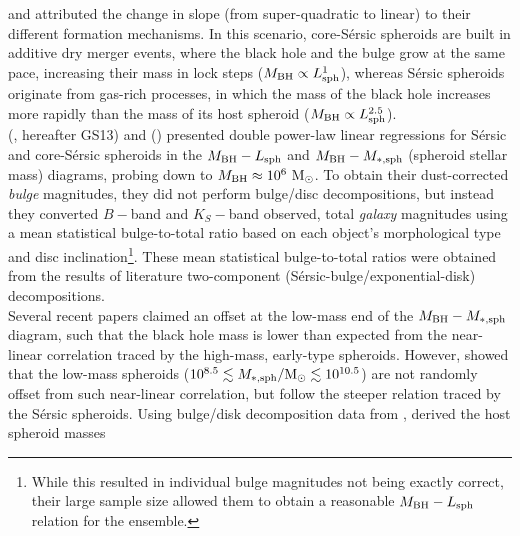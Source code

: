\documentclass[preprint2]{emulateapj}
\begin{document}
and attributed the change in slope (from super-quadratic to linear) to their different formation mechanisms. 
In this scenario, core-S\'ersic spheroids are built in additive dry merger events, 
where the black hole and the bulge grow at the same pace, increasing their mass in lock steps ($M_{\rm BH} \propto L_{\rm sph}^1$), 
whereas S\'ersic spheroids originate from gas-rich processes, 
in which the mass of the black hole increases more rapidly than the mass of its host spheroid ($M_{\rm BH} \propto L_{\rm sph}^{2.5}$). \\
\citeauthor{grahamscott2013} (\citeyear{grahamscott2013}, hereafter GS13) and \citeauthor{scott2013} (\citeyear{scott2013}) 
presented double power-law linear regressions 
for S\'ersic and core-S\'ersic spheroids in the $M_{\rm BH} - L_{\rm sph}$ and $M_{\rm BH} - M_{\rm *,sph}$ 
(spheroid stellar mass) diagrams, probing down to $M_{\rm BH} \approx 10^6\rm~M_\odot$. 
To obtain their dust-corrected \emph{bulge} magnitudes, they did not perform bulge/disc decompositions, 
but instead they converted $B-$band and $K_S-$band observed, total \emph{galaxy} magnitudes 
using a mean statistical bulge-to-total ratio based on each object's morphological type and disc 
inclination\footnote{While this resulted in individual bulge magnitudes not being exactly correct, 
their large sample size allowed them to obtain a reasonable $M_{\rm BH} - L_{\rm sph}$ relation for the ensemble.}. 
These mean statistical bulge-to-total ratios were obtained from the results of literature two-component (S\'ersic-bulge/exponential-disk) decompositions. \\
Several recent papers \citep{jiang2011a,jiang2013,mathur2012,reines2013} claimed an offset at the low-mass end of the $M_{\rm BH} - M_{\rm *,sph}$ diagram,
such that the black hole mass is lower than expected from the near-linear correlation traced by the high-mass, early-type spheroids. 
However, \cite{grahamscott2013} showed that the low-mass spheroids ($10^{8.5} \lesssim M_{\rm *,sph}/{\rm M_\odot} \lesssim 10^{10.5}$) 
are not randomly offset from such near-linear correlation, 
but follow the steeper relation traced by the S\'ersic spheroids. 
Using bulge/disk decomposition data from \cite{jiang2011a}, 
\cite{grahamscott2015} derived the host spheroid masses 
\end{document}
